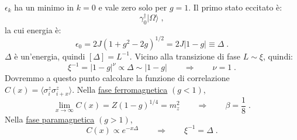 \documentclass[10pt,a4paper]{report}
\theoremstyle{definition}
\numberwithin{equation}{section}
\newcommand{\bra}{\langle}
\newcommand{\ket}{\rangle}
\newcommand{\adj}[1]{#1^{\dagger}}
\begin{document}
$\epsilon_k$ ha un minimo in $k=0$ e vale zero solo per $g=1$. Il primo stato eccitato è:
\begin{equation}
\adj{\gamma}_0|\Omega\ket\;,
\end{equation}
la cui energia è:
\begin{equation}
\epsilon_0=2J(1+g^2-2g)^{1/2}=2J|1-g|\equiv\Delta\;.
\end{equation}
$\Delta$ è un'energia, quindi $[\Delta]=L^{-1}$. Vicino alla transizione di fase $L\sim \xi$, quindi:
\begin{equation}
\xi^{-1}=|1-g|^{\nu}\propto \Delta\sim |1-g|\qquad \Longrightarrow\qquad \nu=1\;.
\end{equation}
Dovremmo a questo punto calcolare la funzione di correlazione $C(x)=\bra\sigma_i^z\sigma_{i+x}^z\ket$. Nella \underline{fase ferromagnetica} $(g<1)$,
\begin{equation}
\lim_{x\to\infty}C(x)=Z(1-g)^{1/4}=m_z^2\qquad \Longrightarrow \qquad \beta=\frac{1}{8}\;.
\end{equation}
Nella \underline{fase paramagnetica} $(g>1)$,
\begin{equation}
C(x)\propto e^{-x\Delta}\qquad \Longrightarrow\qquad \xi^{-1}=\Delta\;.
\end{equation}
\end{document}
